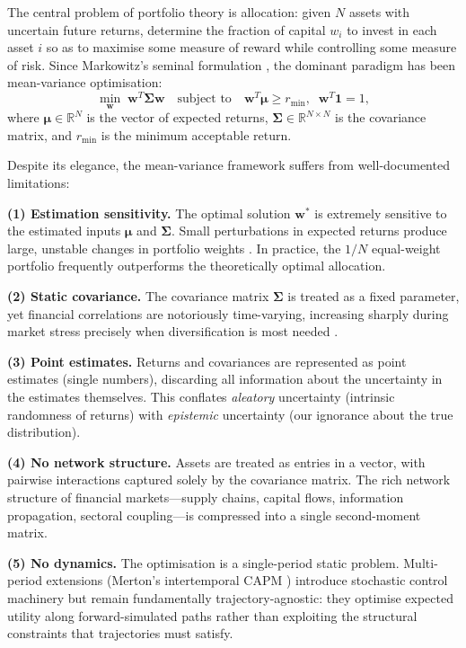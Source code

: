 \documentclass[twocolumn,10pt]{article}
\theoremstyle{remark}
\begin{document}
The central problem of portfolio theory is allocation: given $N$ assets with uncertain future returns, determine the fraction of capital $w_i$ to invest in each asset $i$ so as to maximise some measure of reward while controlling some measure of risk.  Since Markowitz's seminal formulation \cite{markowitz1952}, the dominant paradigm has been mean-variance optimisation:
\begin{equation}
    \min_{\mathbf{w}} \; \mathbf{w}^T \bm{\Sigma} \mathbf{w} \quad \text{subject to} \quad \mathbf{w}^T \bm{\mu} \geq r_{\min}, \;\; \mathbf{w}^T \mathbf{1} = 1,
    \label{eq:markowitz}
\end{equation}
where $\bm{\mu} \in \mathbb{R}^N$ is the vector of expected returns, $\bm{\Sigma} \in \mathbb{R}^{N \times N}$ is the covariance matrix, and $r_{\min}$ is the minimum acceptable return.

Despite its elegance, the mean-variance framework suffers from well-documented limitations:

\textbf{(1) Estimation sensitivity.}  The optimal solution $\mathbf{w}^*$ is extremely sensitive to the estimated inputs $\bm{\mu}$ and $\bm{\Sigma}$.  Small perturbations in expected returns produce large, unstable changes in portfolio weights \cite{demiguel2009,ledoit2004}.  In practice, the $1/N$ equal-weight portfolio frequently outperforms the theoretically optimal allocation.

\textbf{(2) Static covariance.}  The covariance matrix $\bm{\Sigma}$ is treated as a fixed parameter, yet financial correlations are notoriously time-varying, increasing sharply during market stress precisely when diversification is most needed \cite{engle1982,bollerslev1986,cont2001}.

\textbf{(3) Point estimates.}  Returns and covariances are represented as point estimates (single numbers), discarding all information about the uncertainty in the estimates themselves.  This conflates \emph{aleatory} uncertainty (intrinsic randomness of returns) with \emph{epistemic} uncertainty (our ignorance about the true distribution).

\textbf{(4) No network structure.}  Assets are treated as entries in a vector, with pairwise interactions captured solely by the covariance matrix.  The rich network structure of financial markets---supply chains, capital flows, information propagation, sectoral coupling---is compressed into a single second-moment matrix.

\textbf{(5) No dynamics.}  The optimisation is a single-period static problem.  Multi-period extensions (Merton's intertemporal CAPM \cite{merton1973}) introduce stochastic control machinery but remain fundamentally trajectory-agnostic: they optimise expected utility along forward-simulated paths rather than exploiting the structural constraints that trajectories must satisfy.
\end{document}
